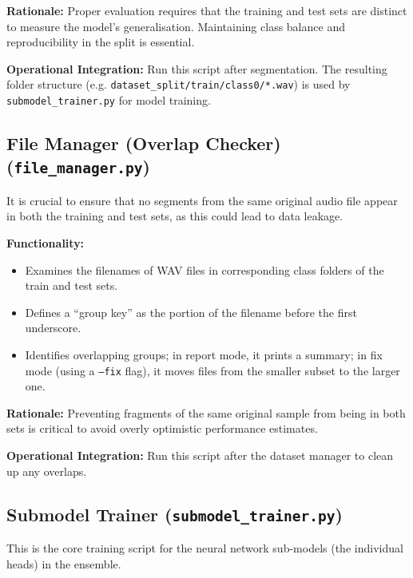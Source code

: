 \documentclass[conference]{IEEEtran}  %
\begin{document}
\textbf{Rationale:} Proper evaluation requires that the training and test sets are distinct to measure the model's generalisation. Maintaining class balance and reproducibility in the split is essential.

\textbf{Operational Integration:} Run this script after segmentation. The resulting folder structure (e.g. \texttt{dataset_split/train/class0/*.wav}) is used by \texttt{submodel\_trainer.py} for model training.

\subsection{File Manager (Overlap Checker) (\texttt{file\_manager.py})}
It is crucial to ensure that no segments from the same original audio file appear in both the training and test sets, as this could lead to data leakage.

\textbf{Functionality:}
\begin{itemize}
    \item Examines the filenames of WAV files in corresponding class folders of the train and test sets.
    \item Defines a ``group key'' as the portion of the filename before the first underscore.
    \item Identifies overlapping groups; in report mode, it prints a summary; in fix mode (using a \texttt{--fix} flag), it moves files from the smaller subset to the larger one.
\end{itemize}

\textbf{Rationale:} Preventing fragments of the same original sample from being in both sets is critical to avoid overly optimistic performance estimates.

\textbf{Operational Integration:} Run this script after the dataset manager to clean up any overlaps.

\subsection{Submodel Trainer (\texttt{submodel\_trainer.py})}
This is the core training script for the neural network sub-models (the individual heads) in the ensemble.
\end{document}
